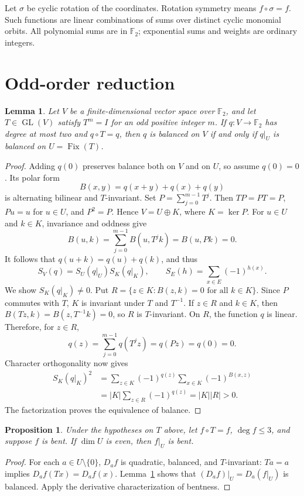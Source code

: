 \documentclass[11pt,a4paper]{article}
\newtheorem{lemma}[theorem]{Lemma}
\newtheorem{proposition}[theorem]{Proposition}
\newcommand{\F}{\mathbb F_2}
\newcommand{\Fix}{\operatorname{Fix}}
\begin{document}
Let $\sigma$ be cyclic rotation of the coordinates. Rotation symmetry means $f\circ\sigma=f$. Such functions are linear combinations of sums over distinct cyclic monomial orbits. All polynomial sums are in $\F$; exponential sums and weights are ordinary integers.

\section{Odd-order reduction}
\begin{lemma}\label{lem:reduction}
Let $V$ be a finite-dimensional vector space over $\F$, and let $T\in\operatorname{GL}(V)$ satisfy $T^m=I$ for an odd positive integer $m$. If $q:V\to\F$ has degree at most two and $q\circ T=q$, then $q$ is balanced on $V$ if and only if $q|_U$ is balanced on $U=\Fix(T)$.
\end{lemma}
\begin{proof}
Adding $q(0)$ preserves balance both on $V$ and on $U$, so assume $q(0)=0$. Its polar form
\[B(x,y)=q(x+y)+q(x)+q(y)\]
is alternating bilinear and $T$-invariant. Set $P=\sum_{j=0}^{m-1}T^j$. Then $TP=PT=P$, $Pu=u$ for $u\in U$, and $P^2=P$. Hence $V=U\oplus K$, where $K=\ker P$. For $u\in U$ and $k\in K$, invariance and oddness give
\[B(u,k)=\sum_{j=0}^{m-1}B(u,T^jk)=B(u,Pk)=0.\]
It follows that $q(u+k)=q(u)+q(k)$, and thus
\[S_V(q)=S_U(q|_U)S_K(q|_K),\qquad S_E(h)=\sum_{x\in E}(-1)^{h(x)}.\]
We show $S_K(q|_K)\ne0$. Put $R=\{z\in K:B(z,k)=0\text{ for all }k\in K\}$. Since $P$ commutes with $T$, $K$ is invariant under $T$ and $T^{-1}$. If $z\in R$ and $k\in K$, then $B(Tz,k)=B(z,T^{-1}k)=0$, so $R$ is $T$-invariant. On $R$, the function $q$ is linear. Therefore, for $z\in R$,
\[q(z)=\sum_{j=0}^{m-1}q(T^jz)=q(Pz)=q(0)=0.\]
Character orthogonality now gives
\begin{align*}
 S_K(q|_K)^2
 &=\sum_{z\in K}(-1)^{q(z)}\sum_{x\in K}(-1)^{B(x,z)}\\
 &=|K|\sum_{z\in R}(-1)^{q(z)}=|K||R|>0.
\end{align*}
The factorization proves the equivalence of balance.
\end{proof}

\begin{proposition}\label{prop:restriction}
Under the hypotheses on $T$ above, let $f\circ T=f$, $\deg f\le3$, and suppose $f$ is bent. If $\dim U$ is even, then $f|_U$ is bent.
\end{proposition}
\begin{proof}
For each $a\in U\setminus\{0\}$, $D_af$ is quadratic, balanced, and $T$-invariant: $Ta=a$ implies $D_af(Tx)=D_af(x)$. Lemma~\ref{lem:reduction} shows that $(D_af)|_U=D_a(f|_U)$ is balanced. Apply the derivative characterization of bentness.
\end{proof}
\end{document}

